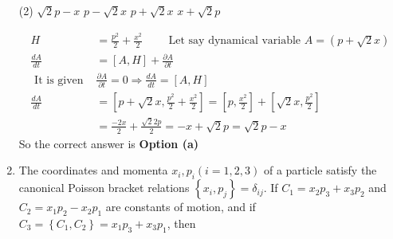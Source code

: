 \begin{enumerate}
 \begin{tasks}(2)
	\task[\textbf{a.}]$\sqrt{2} p-x$
	\task[\textbf{b.}]$p-\sqrt{2} x$
	\task[\textbf{c.}] $p+\sqrt{2} x$
	\task[\textbf{d.}] $x+\sqrt{2} p$
\end{tasks}
\begin{answer}
	$$
	\begin{aligned}
	H&=\frac{p^{2}}{2}+\frac{x^{2}}{2}\qquad \text { Let say dynamical variable } A=(p+\sqrt{2} x)\\
	\frac{d A}{d t}&=[A, H]+\frac{\partial A}{\partial t}\\
	\text { It is given } &\frac{\partial A}{\partial t}=0 \Rightarrow \frac{d A}{d t}=[A, H]\\
	\frac{d A}{d t}&=\left[p+\sqrt{2} x, \frac{p^{2}}{2}+\frac{x^{2}}{2}\right]=\left[p, \frac{x^{2}}{2}\right]+\left[\sqrt{2} x, \frac{p^{2}}{2}\right]\\&=\frac{-2 x}{2}+\frac{\sqrt{2} 2 p}{2}=-x+\sqrt{2} p=\sqrt{2} p-x
\end{aligned}
$$
So the correct answer is \textbf{Option (a)}
\end{answer}
\item The coordinates and momenta $x_{i}, p_{i}(i=1,2,3)$ of a particle satisfy the canonical Poisson bracket relations $\left\{x_{i}, p_{j}\right\}=\delta_{i j}$. If $C_{1}=x_{2} p_{3}+x_{3} p_{2}$ and $C_{2}=x_{1} p_{2}-x_{2} p_{1}$ are constants of motion, and if $C_{3}=\left\{C_{1}, C_{2}\right\}=x_{1} p_{3}+x_{3} p_{1}$, then


\end{enumerate}
